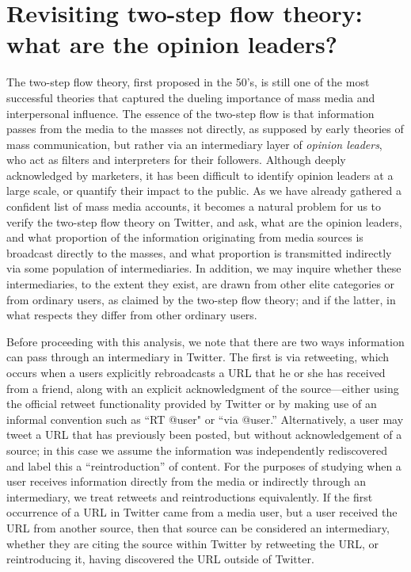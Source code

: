 \documentclass[phd,tocprelim]{cornell}
\begin{document}
\section{Revisiting two-step flow theory: what are the opinion leaders?}
\label{sec:two-step}
The two-step flow theory, first proposed in the 50's, is still one of the most successful theories that captured the dueling importance of mass media and interpersonal influence.  The essence of the two-step flow is that
information passes from the media to the masses not directly, as supposed
by early theories of mass communication, but rather via an intermediary
layer of \emph{opinion leaders}, who act as filters and interpreters for their
followers. Although deeply acknowledged by marketers, it has been difficult to identify opinion leaders at a large scale, or quantify their impact to the public. As we have already gathered a confident list of mass media accounts, it becomes a natural problem for us to verify the two-step flow theory on Twitter, and ask, what are the opinion leaders, and what proportion of the information originating from media sources is broadcast directly to the masses, and what proportion is transmitted indirectly via some population of intermediaries. In addition, we may inquire whether these intermediaries,
to the extent they exist, are drawn from other elite categories or from
ordinary users, as claimed by the two-step flow theory; and if the latter,
in what respects they differ from other ordinary users.

Before proceeding with this analysis, we note that there are two ways
information can pass through an intermediary in Twitter. The first is
via retweeting, which occurs when a users explicitly rebroadcasts a
URL that he or she has received from a friend, along with an explicit
acknowledgment of the source---either using the official retweet
functionality provided by Twitter or by making use of an informal
convention such as ``RT @user" or ``via @user.''  Alternatively, a
user may tweet a URL that has previously been posted, but without
acknowledgement of a source; in this case we assume the information
was independently rediscovered and label this a ``reintroduction'' of
content.
For the purposes of studying when a user receives information directly from
the media or indirectly through an intermediary, we treat retweets and
reintroductions equivalently.  If the first occurrence of a URL in Twitter
came from a media user, but a user received the URL from another source,
then that source can be considered an intermediary, whether they are
citing the source within Twitter by retweeting the URL, or reintroducing
it, having discovered the URL outside of Twitter.
\end{document}
